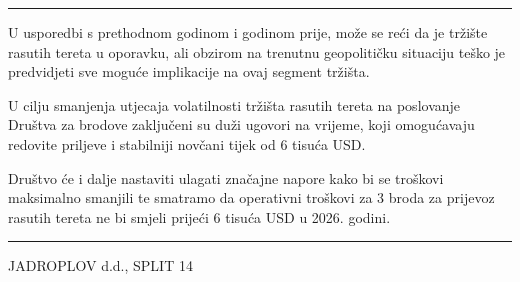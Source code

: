 \documentclass[a4paper,10pt]{article}
\begin{document}
\newpage
\hrule
\vspace{2em}
U usporedbi s prethodnom godinom i godinom prije, može se reći da je tržište rasutih tereta u oporavku, ali
obzirom na trenutnu geopolitičku situaciju teško je predvidjeti sve moguće implikacije na ovaj segment tržišta.

U cilju smanjenja utjecaja volatilnosti tržišta rasutih tereta na poslovanje Društva za brodove zaključeni su
duži ugovori na vrijeme, koji omogućavaju redovite priljeve i stabilniji novčani tijek od 6 tisuća USD.

Društvo će i dalje nastaviti ulagati značajne napore kako bi se troškovi maksimalno smanjili te smatramo da
operativni troškovi za 3 broda za prijevoz rasutih tereta ne bi smjeli prijeći 6 tisuća USD u 2026. godini.
\vfill
\hrule
\vspace{0.5em}
JADROPLOV d.d., SPLIT \hfill 14
\end{document}
